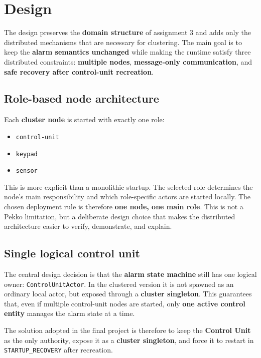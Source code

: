 \clearpage
\section{Design}

The design preserves the \textbf{domain structure} of assignment 3 and adds only
the distributed mechanisms that are necessary for clustering. The main goal is
to keep the \textbf{alarm semantics unchanged} while making the runtime satisfy
three distributed constraints: \textbf{multiple nodes}, \textbf{message-only
communication}, and \textbf{safe recovery after control-unit recreation}.

\subsection{Role-based node architecture}

Each \textbf{cluster node} is started with exactly one role:
\begin{itemize}
    \item \texttt{control-unit}
    \item \texttt{keypad}
    \item \texttt{sensor}
\end{itemize}

This is more explicit than a monolithic startup. The selected role determines
the node's main responsibility and which role-specific actors are started locally.
The chosen deployment rule is therefore \textbf{one node, one main role}. This
is not a Pekko limitation, but a deliberate design choice that makes the
distributed architecture easier to verify, demonstrate, and explain.

\subsection{Single logical control unit}

The central design decision is that the \textbf{alarm state machine} still has
one logical owner: \texttt{ControlUnitActor}. In the clustered version it is not
spawned as an ordinary local actor, but exposed through a \textbf{cluster
singleton}. This guarantees that, even if multiple control-unit nodes are
started, only \textbf{one active control entity} manages the alarm state at a time.

The solution adopted in the final project is therefore to keep the
\textbf{Control Unit} as the only authority, expose it as a \textbf{cluster
singleton}, and force it to restart in \texttt{STARTUP\_RECOVERY} after
recreation.

